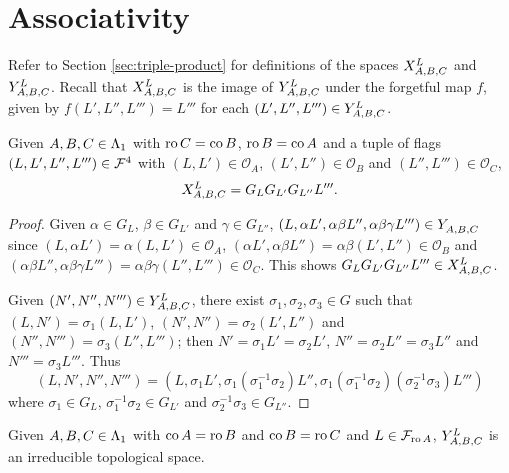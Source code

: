 \documentclass[a4paper, 11pt]{report}
\begin{document}
\section{Associativity}

Refer to Section \ref{sec:triple-product} for definitions of the spaces $\xprod[L]{A,B,C}$ and $\yprod[L]{A,B,C}$. Recall that $\xprod[L]{A,B,C}$ is the image of $\yprod[L]{A,B,C}$ under the forgetful map $f$, given by $f(L',L'',L''') = L'''$ for each $(L',L'',L''')\in\yprod[L]{A,B,C}$.

\begin{lemma}
Given $A,B,C\in\matrices$ with $\ro{C}=\co{B}$, $\ro{B}=\co{A}$ and a tuple of flags $(L,L',L'',L''')\in\flags^4$ with $(L,L')\in\mathcal{O}_A$, $(L',L'')\in\mathcal{O}_B$ and $(L'',L''')\in\mathcal{O}_C$,
\begin{equation*}
\xprod[L]{A,B,C} = G_L G_{L'} G_{L''} L'''.
\end{equation*}
\end{lemma}

\begin{proof}
Given $\alpha\in G_L$, $\beta\in G_{L'}$ and $\gamma\in G_{L''}$, $(L,\alpha L',\alpha\beta L'',\alpha\beta\gamma L''')\in\yprod{A,B,C}$ since $(L,\alpha L')=\alpha(L,L')\in\mathcal{O}_A$, $(\alpha L',\alpha\beta L'')=\alpha\beta(L',L'')\in\mathcal{O}_B$ and $(\alpha\beta L'',\alpha\beta\gamma L''')=\alpha\beta\gamma(L'',L''')\in\mathcal{O}_C$. This shows $G_L G_{L'} G_{L''}L'''\in\xprod[L]{A,B,C}$.

Given $(N',N'',N''')\in\yprod[L]{A,B,C}$, there exist $\sigma_1,\sigma_2,\sigma_3\in G$ such that $(L,N') = \sigma_1(L,L')$, $(N',N'') = \sigma_2(L',L'')$ and $(N'',N''') = \sigma_3(L'',L''')$; then $N' = \sigma_1 L' = \sigma_2 L'$, $N'' = \sigma_2 L'' = \sigma_3 L''$ and $N''' = \sigma_3 L'''$. Thus
\begin{equation*}
(L,N',N'',N''') = (L,\sigma_1 L', \sigma_1(\sigma_1^{-1}\sigma_2)L'', \sigma_1(\sigma_1^{-1}\sigma_2)(\sigma_2^{-1}\sigma_3)L''')
\end{equation*}
where $\sigma_1\in G_L$, $\sigma_1^{-1}\sigma_2\in G_{L'}$ and $\sigma_2^{-1}\sigma_3\in G_{L''}$.
\end{proof}

\begin{lemma}\label{lemma:irreducible-y-triple}
Given $A,B,C\in\matrices$ with $\co{A}=\ro{B}$ and $\co{B}=\ro{C}$ and $L\in\flags_{\ro{A}}$, $\yprod[L]{A,B,C}$ is an irreducible topological space.
\end{lemma}
\end{document}
